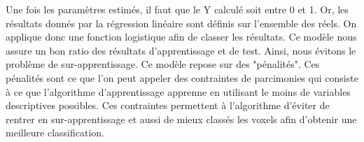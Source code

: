 Une fois les paramètres estimés, il faut que le Y calculé soit entre 0 et 1. Or, les résultats donnés par la régression linéaire sont définis sur l'ensemble des réels. On applique donc une fonction logistique afin de classer les résultats. 
Ce modèle nous assure un bon ratio des résultats d'apprentissage et de test. Ainsi, nous évitons le problème de sur-apprentissage. 
Ce modèle repose sur des "pénalités". Ces pénalités sont ce que l'on peut appeler des contraintes de parcimonies qui consiste à ce que l'algorithme d'apprentissage apprenne en utilisant le moins de variables descriptives possibles. Ces contraintes permettent à l'algorithme d'éviter de rentrer en sur-apprentissage et aussi de mieux classés les voxels afin d'obtenir une meilleure classification.